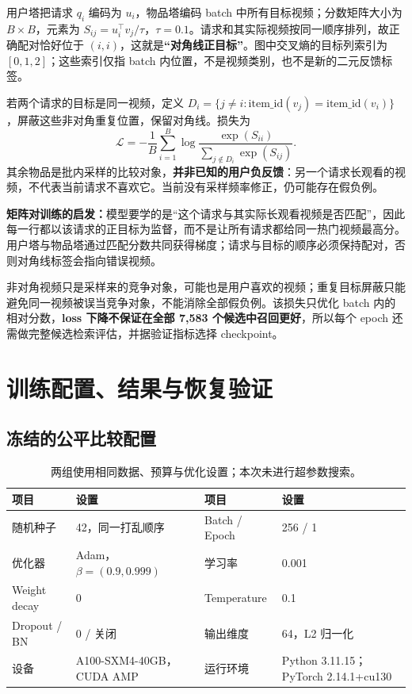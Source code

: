 \documentclass[10pt,a4paper]{article}
\begin{document}
\begin{CJK*}{UTF8}{gbsn}
用户塔把请求 $q_i$ 编码为 $u_i$，物品塔编码 batch 中所有目标视频；分数矩阵大小为 $B\times B$，元素为 $S_{ij}=u_i^\top v_j/\tau$，$\tau=0.1$。请求和其实际视频按同一顺序排列，故正确配对恰好位于 $(i,i)$，这就是\textbf{“对角线正目标”}。图中交叉熵的目标列索引为 $[0,1,2]$；这些索引仅指 batch 内位置，不是视频类别，也不是新的二元反馈标签。

若两个请求的目标是同一视频，定义 $D_i=\{j\ne i:\mathrm{item\_id}(v_j)=\mathrm{item\_id}(v_i)\}$，屏蔽这些非对角重复位置，保留对角线。损失为
\[
\mathcal L=-\frac1B\sum_{i=1}^{B}
\log\frac{\exp(S_{ii})}{\sum_{j\notin D_i}\exp(S_{ij})}.
\]
其余物品是批内采样的比较对象，\textbf{并非已知的用户负反馈}：另一个请求长观看的视频，不代表当前请求不喜欢它。当前没有采样频率修正，仍可能存在假负例。

\textbf{矩阵对训练的启发：}模型要学的是“这个请求与其实际长观看视频是否匹配”，因此每一行都以该请求的正目标为监督，而不是让所有请求都给同一热门视频最高分。用户塔与物品塔通过匹配分数共同获得梯度；请求与目标的顺序必须保持配对，否则对角线标签会指向错误视频。

非对角视频只是采样来的竞争对象，可能也是用户喜欢的视频；重复目标屏蔽只能避免同一视频被误当竞争对象，不能消除全部假负例。该损失只优化 batch 内的相对分数，\textbf{loss 下降不保证在全部 7,583 个候选中召回更好}，所以每个 epoch 还需做完整候选检索评估，并据验证指标选择 checkpoint。


\clearpage
\section{训练配置、结果与恢复验证}
\subsection{冻结的公平比较配置}
\begin{table}[H]\centering\small
\begin{tabularx}{\linewidth}{lYlY}\toprule
项目 & 设置 & 项目 & 设置\\\midrule
随机种子 & 42，同一打乱顺序 & Batch / Epoch & 256 / 1\\
优化器 & Adam，$\beta=(0.9,0.999)$ & 学习率 & 0.001\\
Weight decay & 0 & Temperature & 0.1\\
Dropout / BN & 0 / 关闭 & 输出维度 & 64，L2 归一化\\
设备 & A100-SXM4-40GB，CUDA AMP & 运行环境 & Python 3.11.15；PyTorch 2.14.1+cu130\\\bottomrule
\end{tabularx}\caption{两组使用相同数据、预算与优化设置；本次未进行超参数搜索。}\end{table}


\end{CJK*}
\end{document}
